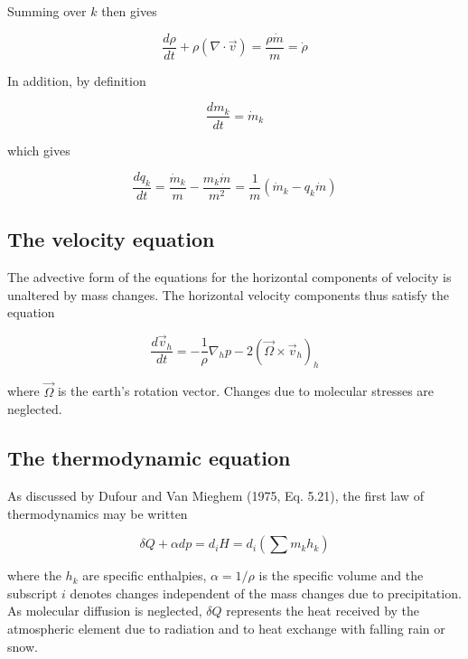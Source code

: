 Summing over $k$ then gives

\begin{equation}
\label{A.2.3.2}
\frac{d\rho}{dt}+\rho(\nabla\cdot \vec{v})=\frac{\rho\dot{m}}{m}=
\dot{\rho}
\end{equation}

In addition, by definition

\begin{equation}
\label{A.2.3.3}
\frac{dm_{k}}{dt}=\dot{m}_{k}
\end{equation}

which gives

\begin{equation}
\label{A.2.3.4}
\frac{dq_{k}}{dt}=\frac{\dot{m}_{k}}{m}-\frac{m_{k}\dot{m}}{m^2}=\frac{1}{m}
(\dot{m}_{k}-q_{k}\dot{m})
\end{equation}

\subsection{The velocity equation}\label{suA.2.4}

The advective form of the
equations for the horizontal components of velocity is unaltered by
mass changes. The horizontal velocity components thus satisfy the
equation

\begin{equation}
\label{A.2.4.1}
\frac{d \vec{v}_{h}}{dt}=-\frac{1}{\rho}\nabla_{h}p-2 (\vec{\Omega} \times
\vec{v}_{h})_h
\end{equation}

where $\vec{\Omega}$ is the earth's rotation vector. Changes due to
molecular stresses are neglected.

\subsection{The thermodynamic equation}\label{suA.2.5}

As discussed by Dufour
and Van Mieghem (1975, Eq. 5.21), the first law of thermodynamics may
be written

\begin{equation}
\label{A.2.5.1}
\delta Q +\alpha dp=d_{i}H=d_{i}\left(\sum m_{k}h_{k}\right)
\end{equation}

where the $h_{k}$ are specific enthalpies, $\alpha=1/\rho$ is the 
specific volume
and the subscript $i $ denotes changes independent of the mass changes due
to precipitation. As molecular diffusion is neglected, $\delta Q$ 
represents the
heat received by the atmospheric element due to radiation and to heat
exchange with falling rain or snow.

